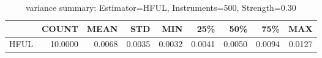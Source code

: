\begin{table}[ht]
\centering
\caption{variance summary: Estimator=HFUL, Instruments=500, Strength=0.30}
\begin{tabular}{lrrrrrrrr}
\toprule
 & COUNT & MEAN & STD & MIN & 25\% & 50\% & 75\% & MAX \\
\midrule
HFUL & 10.0000 & 0.0068 & 0.0035 & 0.0032 & 0.0041 & 0.0050 & 0.0094 & 0.0127 \\
\bottomrule
\end{tabular}
\end{table}
